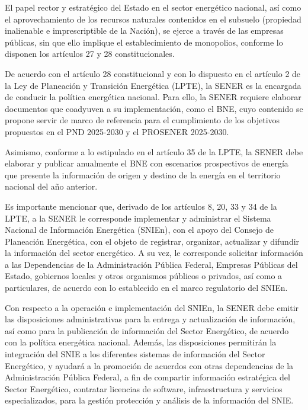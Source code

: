 \documentclass{sener2025}
\begin{document}
El papel rector y estratégico del Estado en el sector energético nacional, así como el aprovechamiento de los recursos naturales contenidos en el subsuelo (propiedad inalienable e imprescriptible de la Nación), se ejerce a través de las empresas públicas, sin que ello implique el establecimiento de monopolios, conforme lo disponen los artículos 27 y 28 constitucionales.

De acuerdo con el artículo 28 constitucional y con lo dispuesto en el artículo 2 de la Ley de Planeación y Transición Energética (LPTE), la SENER es la encargada de conducir la política energética nacional. Para ello, la SENER requiere elaborar documentos que coadyuven a su implementación, como el BNE, cuyo contenido se propone servir de marco de referencia para el cumplimiento de los objetivos propuestos en el PND 2025-2030 y el PROSENER 2025-2030.

Asimismo, conforme a lo estipulado en el artículo 35 de la LPTE, la SENER debe elaborar y publicar anualmente el BNE con escenarios prospectivos de energía que presente la información de origen y destino de la energía en el territorio nacional del año anterior.

Es importante mencionar que, derivado de los artículos 8, 20, 33 y 34 de la LPTE, a la SENER le corresponde implementar y administrar el Sistema Nacional de Información Energética (SNIEn), con el apoyo del Consejo de Planeación Energética, con el objeto de registrar, organizar, actualizar y difundir la información del sector energético. A su vez, le corresponde solicitar información a las Dependencias de la Administración Pública Federal, Empresas Públicas del Estado, gobiernos locales y otros organismos públicos o privados, así como a particulares, de acuerdo con lo establecido en el marco regulatorio del SNIEn.

Con respecto a la operación e implementación del SNIEn, la SENER debe emitir las disposiciones administrativas para la entrega y actualización de información, así como para la publicación de información del Sector Energético, de acuerdo con la política energética nacional. Además, las disposiciones permitirán la integración del SNIE a los diferentes sistemas de información del Sector Energético, y ayudará a la promoción de acuerdos con otras dependencias de la Administración Pública Federal, a fin de compartir información estratégica del Sector Energético, contratar licencias de software, infraestructura y servicios especializados, para la gestión protección y análisis de la información del SNIE.
\end{document}
